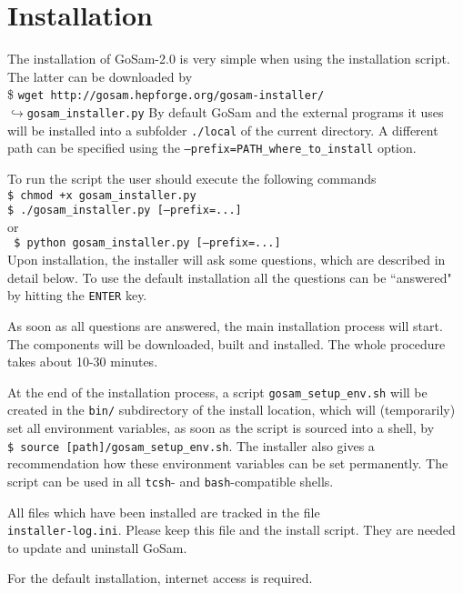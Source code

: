 \documentclass[11pt,a4paper]{refrep}
\newcommand{\gosamversion}{{2{.}0}}
\newcommand{\gosam}{{\sc GoSam}\xspace}
\newcommand{\contl}{{\ensuremath{\hookrightarrow}}}
\newcommand{\bcen}{\begin{center}}
\newcommand{\ecen}{\end{center}}
\begin{document}
\section{Installation}

The installation of \gosam-\gosamversion{} is very simple when using the installation script.
The latter can be downloaded by\\
\$   {\tt wget  http://gosam.hepforge.org/gosam-installer/}\\
\contl{}{\tt gosam\_installer.py}
By default \gosam{} and the external programs it uses  will be 
installed into a subfolder {\tt ./local}
of the current directory. A different path can be specified 
using the {\tt --prefix=PATH\_where\_to\_install} option.

\noindent To run the script the user should execute the following commands\\
{\tt \$  chmod +x gosam\_installer.py\\
     \$  ./gosam\_installer.py     [--prefix=...]
}\\ 
 or\\
{\tt           
\$ python gosam\_installer.py   [--prefix=...]
}\\
Upon installation, the installer will ask some questions, which are described in 
detail below. To use the default installation all the questions can 
be ``answered" by hitting the {\tt ENTER} key.

As soon as all questions are answered, the main installation process will start. 
The components will be downloaded, built and installed. 
The whole procedure takes about 10-30 minutes.

At the end of the installation process, 
a script {\tt gosam\_setup\_env.sh} will be created in the
{\tt bin/} subdirectory of the install location, 
which will (temporarily) set all environment
variables, as soon as the script is sourced into a shell,  
by \\
{\tt \$ source [path]/gosam\_setup\_env.sh}.
The installer also gives  a recommendation how
these environment variables can be set permanently.
The script can be used in all {\tt tcsh}- and {\tt bash}-compatible shells.

All  files which have been installed are tracked in the file \\
{\tt installer-log.ini}.
Please keep this file and the install script. They are needed to update and
uninstall \gosam. 

For the default installation, internet access is required.
\end{document}
